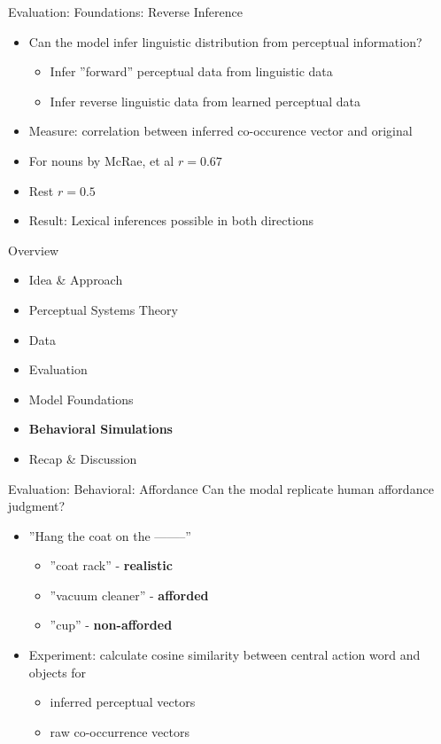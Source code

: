 \documentclass[12pt,a4paper]{beamer}
\begin{document}
\begin{frame}{Evaluation: Foundations: Reverse Inference}
\begin{itemize}
\item Can the model infer linguistic distribution from perceptual information?
    \begin{itemize}
    \item Infer ''forward'' perceptual data from linguistic data
    \item Infer reverse linguistic data from learned perceptual data
    \end{itemize}
\item Measure: correlation between inferred co-occurence vector and original
\item For nouns by McRae, et al $r = 0.67$
\item Rest $r = 0.5$
\item Result: Lexical inferences possible in both directions
\end{itemize}
\end{frame}


\begin{frame}{Overview}
\begin{itemize}
\item Idea \& Approach 
\item Perceptual Systems Theory
\item Data
\item Evaluation
    \item Model Foundations
    \item \textbf{Behavioral Simulations}
\item Recap \& Discussion
\end{itemize}
\end{frame}


\begin{frame}{Evaluation: Behavioral: Affordance}
Can the modal replicate human affordance judgment?
\begin{itemize}
\item ''Hang the coat on the --------''
    \begin{itemize}
    \item ''coat rack'' - \textbf{realistic}
    \item ''vacuum cleaner'' - \textbf{afforded}
    \item ''cup'' - \textbf{non-afforded}
    \end{itemize}
\item Experiment: calculate cosine similarity between central action word and objects for
    \begin{itemize}
    \item inferred perceptual vectors
    \item raw co-occurrence vectors
    \end{itemize}
\end{itemize}
\end{frame}
\end{document}

